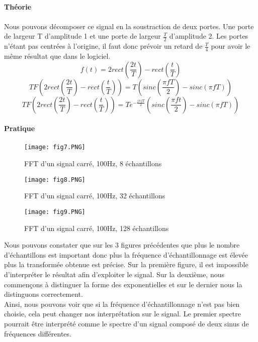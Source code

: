 \documentclass[oneside,a4paper,12pt]{article}
\begin{document}
	\paragraph{Théorie}\paragraph{}
	Nous pouvons décomposer ce signal en la soustraction de deux portes. Une porte de largeur T d’amplitude 1 et une porte de largeur $\frac{T}{2}$ d’amplitude 2. Les portes n’étant pas centrées à l’origine, il faut donc prévoir un retard de $\frac{T}{4}$ pour avoir le même résultat que dans le logiciel.\\
	$$ f(t)=2rect(\frac{2t}{T})-rect(\frac{t}{T}) $$
	$$ TF(2rect(\frac{2t}{T})-rect(\frac{t}{T})) = T(sinc(\frac{\pi f T}{2}) - sinc(\pi f T)) $$
	$$ TF(2rect(\frac{2t}{T})-rect(\frac{t}{T})) = Te^{-\frac{j \pi f T}{2}}(sinc(\frac{\pi f t }{2}) - sinc(\pi f T) ) $$
	
	\paragraph{Pratique}\paragraph{}
	
	\begin{figure}[h]
		\centering
		\texttt{[image: fig7.PNG]}
		\caption{FFT d'un signal carré, 100Hz, 8 échantillons}
	\end{figure}
	\newpage

	\begin{figure}[h]
		\centering
		\texttt{[image: fig8.PNG]}
		\caption{FFT d'un signal carré, 100Hz, 32 échantillons}
	\end{figure}

	\begin{figure}[h]
		\centering
		\texttt{[image: fig9.PNG]}
		\caption{FFT d'un signal carré, 100Hz, 128 échantillons}
	\end{figure}
	\newpage
	
	Nous pouvons constater que sur les 3 figures précédentes que plus le nombre d’échantillons est important donc plus la fréquence d'échantillonnage est élevée plus la transformée obtenue est précise. Sur la première figure, il est impossible d'interpréter le résultat afin d’exploiter le signal. Sur la deuxième, nous commençons à distinguer la forme des exponentielles et sur le dernier nous la distinguons correctement.\\
	Ainsi, nous pouvons voir que si la fréquence d'échantillonnage n’est pas bien choisie, cela peut changer nos interprétation sur le signal. Le premier spectre pourrait être interprété comme le spectre d’un signal composé de deux sinus de fréquences différentes.
	\newpage
\end{document}

